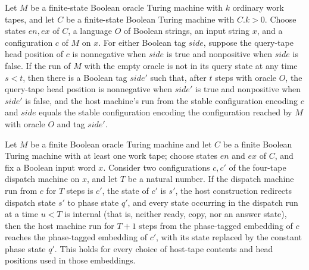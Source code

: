 \begin{theorem}
\label{Turing.oracleHost_offQuery}
\leanok
{}
Let $M$ be a finite-state Boolean oracle Turing machine with $k$ ordinary work tapes,
and let $C$ be a finite-state Boolean Turing machine with $C.k>0$. Choose states $en,ex$
of $C$, a language $O$ of Boolean strings, an input string $x$, and a configuration $c$
of $M$ on $x$. For either Boolean tag $side$, suppose the query-tape head position of
$c$ is nonnegative when $side$ is true and nonpositive when $side$ is false. If the run
of $M$ with the empty oracle is not in its query state at any time $s<t$, then there is
a Boolean tag $side'$ such that, after $t$ steps with oracle $O$, the query-tape head
position is nonnegative when $side'$ is true and nonpositive when $side'$ is false, and
the host machine’s run from the stable configuration encoding $c$ and $side$ equals the
stable configuration encoding the configuration reached by $M$ with oracle $O$ and tag
$side'$.
\end{theorem}

\begin{theorem}
\label{Turing.oracleHost_dispatch}
\leanok
{}
Let $M$ be a finite Boolean oracle Turing machine and let $C$ be a finite Boolean Turing
machine with at least one work tape; choose states $en$ and $ex$ of $C$, and fix a
Boolean input word $x$. Consider two configurations $c,c'$ of the four-tape dispatch
machine on $x$, and let $T$ be a natural number. If the dispatch machine run from $c$
for $T$ steps is $c'$, the state of $c'$ is $s'$, the host construction redirects
dispatch state $s'$ to phase state $q'$, and every state occurring in the dispatch run
at a time $u<T$ is internal (that is, neither ready, copy, nor an answer state), then
the host machine run for $T+1$ steps from the phase-tagged embedding of $c$ reaches the
phase-tagged embedding of $c'$, with its state replaced by the constant phase state
$q'$. This holds for every choice of host-tape contents and head positions used in those
embeddings.
\end{theorem}

